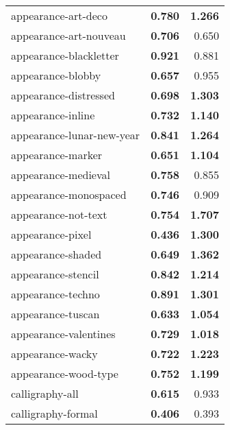 \begin{longtable}{|l|r|r|}
appearance-art-deco       & \textbf{0.780}             & \textbf{1.266}          \\
appearance-art-nouveau    & \textbf{0.706}             & 0.650                   \\
appearance-blackletter    & \textbf{0.921}             & 0.881                   \\
appearance-blobby         & \textbf{0.657}             & 0.955                   \\
appearance-distressed     & \textbf{0.698}             & \textbf{1.303}          \\
appearance-inline         & \textbf{0.732}             & \textbf{1.140}          \\
appearance-lunar-new-year & \textbf{0.841}             & \textbf{1.264}          \\
appearance-marker         & \textbf{0.651}             & \textbf{1.104}          \\
appearance-medieval       & \textbf{0.758}             & 0.855                   \\
appearance-monospaced     & \textbf{0.746}             & 0.909                   \\
appearance-not-text       & \textbf{0.754}             & \textbf{1.707}          \\
appearance-pixel          & \textbf{0.436}             & \textbf{1.300}          \\
appearance-shaded         & \textbf{0.649}             & \textbf{1.362}          \\
appearance-stencil        & \textbf{0.842}             & \textbf{1.214}          \\
appearance-techno         & \textbf{0.891}             & \textbf{1.301}          \\
appearance-tuscan         & \textbf{0.633}             & \textbf{1.054}          \\
appearance-valentines     & \textbf{0.729}             & \textbf{1.018}          \\
appearance-wacky          & \textbf{0.722}             & \textbf{1.223}          \\
appearance-wood-type      & \textbf{0.752}             & \textbf{1.199}          \\
calligraphy-all           & \textbf{0.615}             & 0.933                   \\
calligraphy-formal        & \textbf{0.406}             & 0.393                   \\

\end{longtable}
